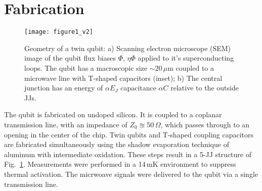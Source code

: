 \section{Fabrication}

\begin{figure}[h]
  \texttt{[image: figure1\_v2]}
  \caption{\small Geometry of a twin qubit: a) Scanning electron microscope (SEM) image of the qubit flux biases $ \Phi $,
    $ \eta\Phi $ applied to it's superconducting loops. The qubit has a macroscopic size $ \sim 20\,\mu $m coupled to a microwave line with
    T-shaped capacitors (inset); b) The central junction has an energy of $ \alpha E_{J}$ capacitance $\alpha C$ relative to the outside
    JJs.}
    \label{fig:setup}
\end{figure}

\noindent The qubit is fabricated on undoped silicon. It is coupled to a coplanar transmission line, with an impedance of
$ Z_{0} \approxeq 50\,\Omega $, which passes through to an opening in the center of the chip. Twin qubits and T-shaped coupling capacitors are
fabricated simultaneously using the shadow evaporation technique  of aluminum with
intermediate oxidation. These steps result in a 5-JJ structure of Fig.~\ref{fig:setup}. Measurements were performed in a 14\,mK
environment to suppress thermal activation. The micrwoave signals were delivered to the qubit via a single transmission line.


